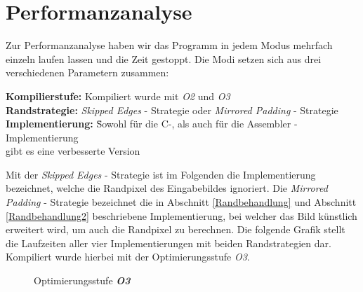 \documentclass[course=asp]{aspdoc}
\begin{document}
\section{Performanzanalyse} \label{Performanzanalyse}
Zur Performanzanalyse haben wir das Programm in jedem Modus mehrfach einzeln laufen lassen und die Zeit gestoppt. Die Modi setzen sich aus drei verschiedenen Parametern zusammen:
\begin{tabbing}
\textbf{Kompilierstufe:} \:\:\: Kompiliert wurde mit \textit{O2} und \textit{O3}\\
\textbf{Randstrategie:} \:\:\:\:\:\:\:\textit{Skipped Edges} - Strategie oder \textit{Mirrored Padding} - Strategie\\
\textbf{Implementierung:} \= Sowohl für die C-, als auch für die Assembler - Implementierung\\ \> gibt es eine verbesserte Version\\
\end{tabbing}
\vspace{-0.5cm}Mit der \textit{Skipped Edges} - Strategie ist im Folgenden die Implementierung bezeichnet, welche die Randpixel des Eingabebildes ignoriert. Die \textit{Mirrored Padding} - Strategie bezeichnet die in Abschnitt \ref{Randbehandlung} und Abschnitt \ref{Randbehandlung2} beschriebene Implementierung, bei welcher das Bild künstlich erweitert wird, um auch die Randpixel zu berechnen.\newline
Die folgende Grafik stellt die Laufzeiten aller vier Implementierungen mit beiden Randstrategien dar. Kompiliert wurde hierbei mit der Optimierungsstufe \textit{O3}.
\begin{figure}[ht!]
\caption{Optimierungsstufe \textbf{\textit{O3}}}
\label{Abb:1}
\begin{center}
\end{center}
\end{figure}
\end{document}
